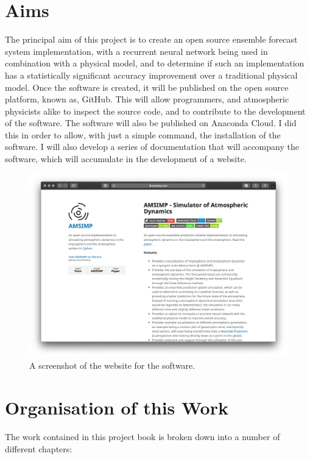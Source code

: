 \section{Aims}
The principal aim of this project is to create an open source ensemble forecast system implementation, with a recurrent neural network being used in combination with a physical model, and to determine if such an implementation has a statistically significant accuracy improvement over a traditional physical model. Once the software is created, it will be published on the open source platform, known as, GitHub. This will allow programmers, and atmospheric physicists alike to inspect the source code, and to contribute to the development of the software. The software will also be published on Anaconda Cloud. I did this in order to allow, with just a simple command, the installation of the software. I will also develop a series of documentation that will accompany the software, which will accumulate in the development of a website.
\begin{figure}[H]
    \centering
    \includegraphics[width=.75\linewidth]{Images/website}
    \caption{A screenshot of the website for the software.}
    \label{website}
\end{figure}

\section{Organisation of this Work}
The work contained in this project book is broken down into a number of different chapters:

